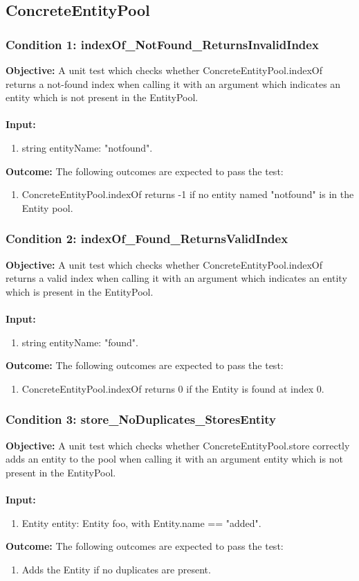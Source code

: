 \documentclass[a4paper,12pt]{article}
\begin{document}
	\subsection{ConcreteEntityPool}
		\subsubsection{Condition 1: indexOf\_NotFound\_ReturnsInvalidIndex}
			\textbf{Objective:} A unit test which checks whether ConcreteEntityPool.indexOf returns a not-found index when calling it with an argument which indicates an entity which is not present in the EntityPool.\\\\
			\textbf{Input:} 
				\begin{enumerate}
					\item string entityName: "notfound".
				\end{enumerate}
			\textbf{Outcome:} The following outcomes are expected to pass the test:
				\begin{enumerate}
					\item ConcreteEntityPool.indexOf returns -1 if no entity named "notfound" is in the Entity pool.
				\end{enumerate}
		\subsubsection{Condition 2: indexOf\_Found\_ReturnsValidIndex}
			\textbf{Objective:} A unit test which checks whether ConcreteEntityPool.indexOf returns a valid index when calling it with an argument which indicates an entity which is present in the EntityPool.\\\\
			\textbf{Input:} 
				\begin{enumerate}
					\item string entityName: "found".
				\end{enumerate}
			\textbf{Outcome:} The following outcomes are expected to pass the test:
				\begin{enumerate}
					\item ConcreteEntityPool.indexOf returns 0 if the Entity is found at index 0.
				\end{enumerate}
		\subsubsection{Condition 3: store\_NoDuplicates\_StoresEntity}
			\textbf{Objective:} A unit test which checks whether ConcreteEntityPool.store correctly adds an entity to the pool when calling it with an argument entity which is not present in the EntityPool.\\\\
			\textbf{Input:}  
				\begin{enumerate}
					\item Entity entity: Entity foo, with Entity.name == "added".
				\end{enumerate}
			\textbf{Outcome:} The following outcomes are expected to pass the test:
				\begin{enumerate}
					\item Adds the Entity if no duplicates are present.
				\end{enumerate}
\end{document}
